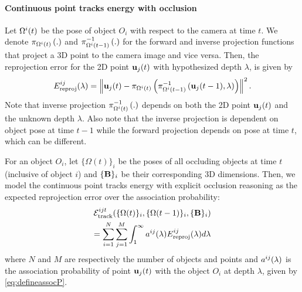 \vspace{-0.3cm}
\paragraph{Continuous point tracks energy with occlusion}
Let $\Omega^{i}(t)$ be the pose of object $O_i$ with respect to the camera at time $t$. We denote $\pi_{\Omega^{i}(t)}\left(.\right)$ and $\pi^{-1}_{\Omega^{i}(t-1)}\left(.\right)$ for the forward and inverse projection functions that project a 3D point to the camera image and vice versa. Then, the reprojection error for the 2D point $\mathbf{u}_j(t)$ with hypothesized depth $\lambda$, is given by
\begin{equation}
E^{ij}_{\text{reproj}}(\lambda) = \left\|\mathbf{u}_j(t) - \pi_{\Omega^{i}(t)}\left(\pi^{-1}_{\Omega^{i}(t-1)}\left(\mathbf{u}_j(t-1), \lambda\right)\right)\right\|^2.
\label{eq:reprojerror}
\end{equation}
Note that inverse projection $\pi^{-1}_{\Omega^{i}(t)}\left(.\right)$ depends on both the 2D point $\mathbf{u}_j(t)$ and the unknown depth $\lambda$. Also note that the inverse projection is dependent on object pose at time $t-1$ while the forward projection depends on pose at time $t$, which can be different.

For an object $O_i$, let $\{ \Omega (t) \}_i$ be the poses of all occluding objects at time $t$ (inclusive of object $i$) and $ \{ \mathbf{B} \}_i$ be their corresponding 3D dimensions. Then, we model the continuous point tracks energy with explicit occlusion reasoning as the expected reprojection error over the association probability:
\begin{multline}
  \mathcal{E}^{ijt}_{\text{track}}(\{ \Omega (t) \}_i, \{ \Omega (t-1) \}_i, \{ \mathbf{B} \}_i )
  \\
    = \sum_{i=1}^{N} 
    \sum_{j = 1}^{M}
    \int_1^\infty a^{ij}(\lambda)E^{ij}_{\text{reproj}}(\lambda) d\lambda
\end{multline}
where $N$ and $M$ are respectively the number of objects and points and $a^{ij}(\lambda)$ is the association probability of point $\mathbf{u}_j(t)$ with the object $O_i$ at depth $\lambda$, given by \eqref{eq:defineassocP}.


